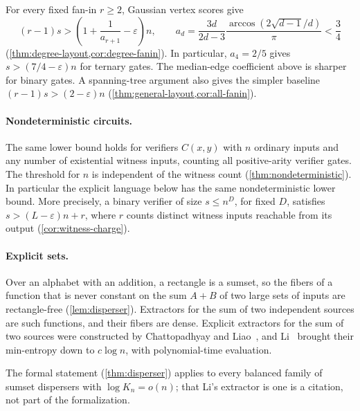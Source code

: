 \documentclass[11pt]{article}
\newcommand{\leanrefs}[1]{{\unskip\nobreak\hfil\penalty50\hskip1em\null\nobreak\hfil
  {\normalfont\small #1}\parfillskip=0pt\finalhyphendemerits=0\par}}
\newcommand{\leanref}[1]{\leanrefs{\lean{#1}}}
\theoremstyle{plain}
\theoremstyle{definition}
\theoremstyle{remark}
\begin{document}
For every fixed fan-in $r\ge2$, Gaussian vertex scores give
\[
  (r-1)s>\left(1+\frac1{a_{r+1}}-\varepsilon\right)n,
  \qquad a_d=\frac{3d}{2d-3}\frac{\arccos(2\sqrt{d-1}/d)}{\pi}<\frac34
\]
(\cref{thm:degree-layout,cor:degree-fanin}). In particular, $a_4=2/5$ gives
$s>(7/4-\varepsilon)n$ for ternary gates. The median-edge coefficient above is sharper
for binary gates. A spanning-tree argument also gives the simpler baseline
$(r-1)s>(2-\varepsilon)n$ (\cref{thm:general-layout,cor:all-fanin}).

\paragraph{Nondeterministic circuits.}
The same lower bound holds for verifiers $C(x,y)$ with $n$ ordinary inputs and any number of
existential witness inputs, counting all positive-arity verifier gates. The threshold for $n$
is independent of the witness count (\cref{thm:nondeterministic}). In particular the explicit
language below has the same nondeterministic lower bound. More precisely, a binary verifier
of size $s\le n^D$, for fixed $D$, satisfies $s>(L-\varepsilon)n+r$, where $r$ counts distinct
witness inputs reachable from its output (\cref{cor:witness-charge}).

\paragraph{Explicit sets.}
Over an alphabet with an addition, a rectangle is a sumset, so the fibers of a function that is
never constant on the sum $A + B$ of two large sets of inputs are rectangle-free
(\cref{lem:disperser}). Extractors for the sum of two independent sources are such functions,
and their fibers are dense. Explicit extractors for the sum of two sources were constructed by
Chattopadhyay and Liao~\cite{ChattopadhyayLiao2022}, and Li~\cite{Li2023} brought their
min-entropy down to $c \log n$, with polynomial-time evaluation.


The formal statement (\cref{thm:disperser}) applies to every balanced family of sumset
dispersers with $\log K_n = o(n)$; that Li's extractor is one is a citation, not part of the
formalization.
\end{document}
